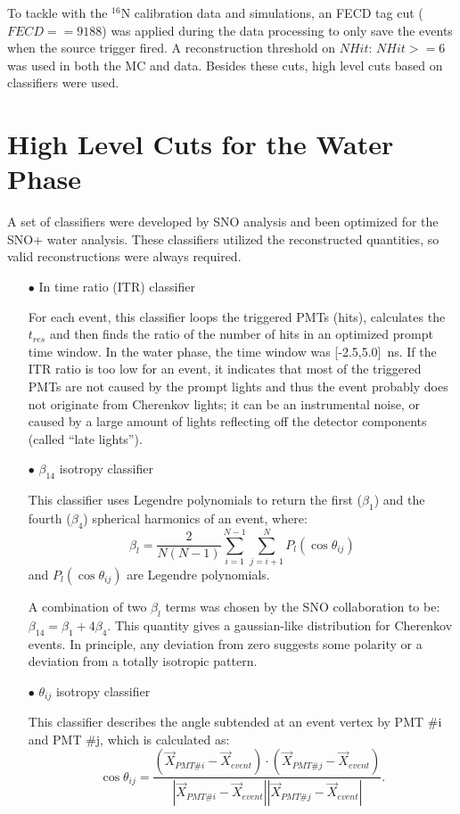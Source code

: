 To tackle with the $^{16}$N calibration data and simulations, an FECD tag cut ($FECD==9188$) was applied during the data processing to only save the events when the source trigger fired. A reconstruction threshold on $NHit$: $NHit>=6$ was used in both the MC and data. Besides these cuts, high level cuts based on classifiers were used. 

\section{High Level Cuts for the Water Phase}\label{sect:high_level_cuts}
A set of classifiers were developed by SNO analysis and been optimized for the SNO+ water analysis\cite{highlevel}. These classifiers utilized the reconstructed quantities, so valid reconstructions were always required.

\begin{itemize}
	\item[$\bullet$] In time ratio (ITR) classifier
	
	For each event, this classifier loops the triggered PMTs (hits), calculates the $t_{res}$ and then finds the ratio of the number of hits in an optimized prompt time window. In the water phase, the time window was [-2.5,5.0]~ns. If the ITR ratio is too low for an event, it indicates that most of the triggered PMTs are not caused by the prompt lights and thus the event probably does not originate from Cherenkov lights; it can be an instrumental noise, or caused by a large amount of lights reflecting off the detector components (called ``late lights''). 
	
	\item[$\bullet$] $\beta_{14}$ isotropy classifier
	
	This classifier uses Legendre polynomials to return the	first ($\beta_1$) and the fourth ($\beta_4$) spherical harmonics of an event, where:
	\[
	\beta_l = \frac{2}{N(N-1)}\sum_{i=1}^{N-1}\sum_{j=i+1}^N P_l(\cos\theta_{ij})
	\]
	and $P_l(\cos\theta_{ij})$ are Legendre polynomials. 
	
	A combination of two $\beta_l$ terms was chosen by the SNO collaboration to be: $\beta_{14}=\beta_1+4\beta_4$. This quantity gives a gaussian-like distribution for Cherenkov events\cite{dunmore2004separation}.	In principle, any deviation from zero suggests some polarity or a deviation from a totally isotropic pattern.
	
	\item[$\bullet$] $\theta_{ij}$ isotropy classifier 
	
	This classifier describes the angle subtended at an event vertex by PMT \#i and PMT \#j, which is calculated as:
	\begin{equation}
	\cos\theta_{ij}=\frac{(\vec{X}_{PMT\#i}- \vec{X}_{event})\cdot (\vec{X}_{PMT\#j}- \vec{X}_{event})}{|\vec{X}_{PMT\#i}- \vec{X}_{event}||\vec{X}_{PMT\#j}- \vec{X}_{event}|}.
	\end{equation}
\end{itemize}

